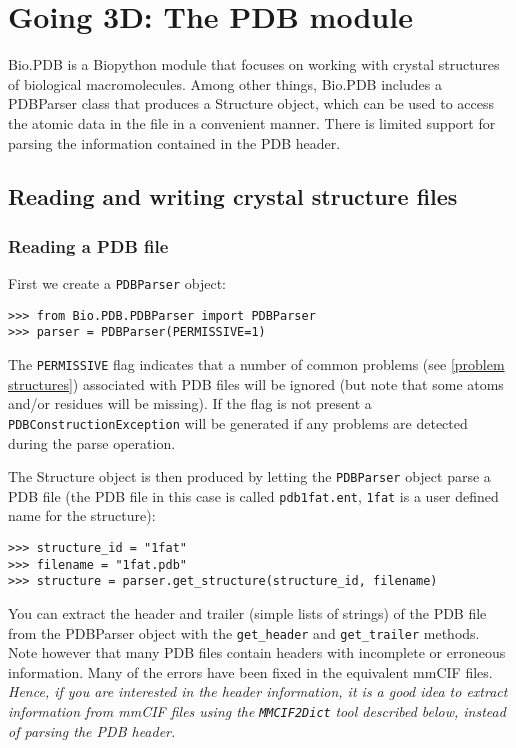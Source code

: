 \chapter{Going 3D: The PDB module}

Bio.PDB is a Biopython module that focuses on working with crystal structures of biological macromolecules. Among other things, Bio.PDB includes a PDBParser class that produces a Structure object, which can be used to access the atomic data in the file in a convenient manner. There is limited support for parsing the information contained in the PDB header.


\section{Reading and writing crystal structure files}

\subsection{Reading a PDB file}

First we create a \texttt{PDBParser} object:

\begin{verbatim}
>>> from Bio.PDB.PDBParser import PDBParser
>>> parser = PDBParser(PERMISSIVE=1)
\end{verbatim}

The {\tt PERMISSIVE} flag indicates that a number of common problems (see \ref{problem structures}) associated with PDB files will be ignored (but note that some atoms and/or residues will be missing). If the flag is not present a {\tt PDBConstructionException} will be generated if any problems are detected during the parse operation.

The Structure object is then produced by letting the \texttt{PDBParser} object parse a PDB file (the PDB file in this case is called \verb|pdb1fat.ent|, \verb|1fat| is a user defined name for the structure):

\begin{verbatim}
>>> structure_id = "1fat"
>>> filename = "1fat.pdb"
>>> structure = parser.get_structure(structure_id, filename)
\end{verbatim}

You can extract the header and trailer (simple lists of strings) of the PDB
file from the PDBParser object with the {\tt get\_header} and {\tt get\_trailer}
methods.  Note however that many PDB files contain headers with
incomplete or erroneous information. Many of the errors have been
fixed in the equivalent mmCIF files. \emph{Hence, if you are interested
in the header information, it is a good idea to extract information
from mmCIF files using the} \texttt{\emph{MMCIF2Dict}} \emph{tool
described below, instead of parsing the PDB header. }

